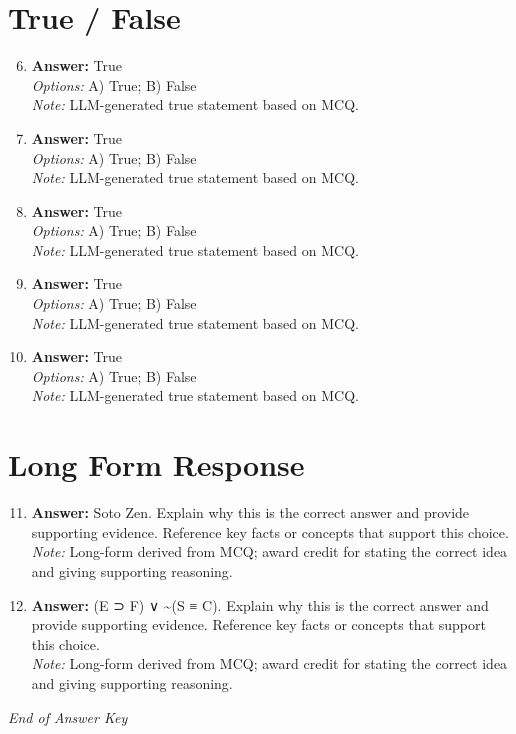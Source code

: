\documentclass[12pt]{article}
\begin{document}
\section*{True / False}
\begin{enumerate}[label=\arabic*.]
\setcounter{enumi}{5}
\item \textbf{Answer:} True
\\ \textit{Options:} A) True; B) False
\\ \textit{Note:} LLM-generated true statement based on MCQ.
\item \textbf{Answer:} True
\\ \textit{Options:} A) True; B) False
\\ \textit{Note:} LLM-generated true statement based on MCQ.
\item \textbf{Answer:} True
\\ \textit{Options:} A) True; B) False
\\ \textit{Note:} LLM-generated true statement based on MCQ.
\item \textbf{Answer:} True
\\ \textit{Options:} A) True; B) False
\\ \textit{Note:} LLM-generated true statement based on MCQ.
\item \textbf{Answer:} True
\\ \textit{Options:} A) True; B) False
\\ \textit{Note:} LLM-generated true statement based on MCQ.
\end{enumerate}

\section*{Long Form Response}
\begin{enumerate}[label=\arabic*.]
\setcounter{enumi}{10}
\item \textbf{Answer:} Soto Zen. Explain why this is the correct answer and provide supporting evidence. Reference key facts or concepts that support this choice.
\\ \textit{Note:} Long-form derived from MCQ; award credit for stating the correct idea and giving supporting reasoning.
\item \textbf{Answer:} (E ⊃ F) ∨ \textasciitilde{}(S ≡ C). Explain why this is the correct answer and provide supporting evidence. Reference key facts or concepts that support this choice.
\\ \textit{Note:} Long-form derived from MCQ; award credit for stating the correct idea and giving supporting reasoning.
\end{enumerate}

\vfill
\noindent\textit{End of Answer Key}
\end{document}
